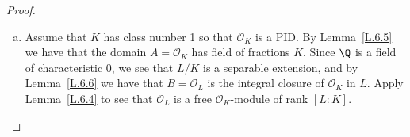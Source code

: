 \documentclass[10pt]{amsart}
\begin{document}
\begin{thm}
\begin{proof}
		\begin{enumerate}[(a)]
			\item
			Assume that $K$ has class number 1 so that $\mathcal{O}_K$ is a PID.
			By Lemma~\ref{L.6.5} we have that the domain $A = \mathcal{O}_K$ has field of fractions $K$.
			Since $\Q$ is a field of characteristic 0, we see that $L/K$ is a separable extension, and by Lemma~\ref{L.6.6} we have that $B = \mathcal{O}_L$ is the integral closure of $\mathcal{O}_K$ in $L$.
			Apply Lemma~\ref{L.6.4} to see that $\mathcal{O}_L$ is a free $\mathcal{O}_K$-module of rank $[L : K]$.
		\end{enumerate}
	\end{proof}
\end{thm}
\end{document}
